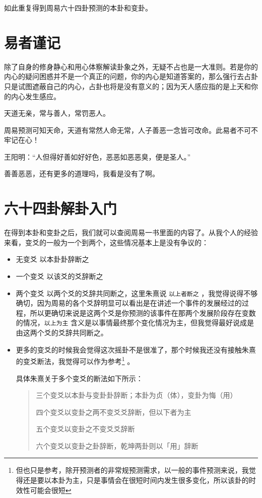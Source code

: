 \documentclass[12pt,oneside]{book}
\begin{document}
如此重复得到周易六十四卦预测的本卦和变卦。

\section{易者谨记}
除了自身的修身静心和用心体察解读卦象之外，无疑不占也是一大准则。若是你的内心的疑问困惑并不是一个真正的问题，你的内心是知道答案的，那么强行去占卦只是试图遮蔽自己的内心，占卦也将是没有意义的；因为天人感应指的是上天和你的内心发生感应。

天道无亲，常与善人，常罚恶人。

周易预测可知天命，天道有常然人命无常，人子善恶一念皆可改命。此易者不可不牢记在心！

王阳明：“人但得好善如好好色，恶恶如恶恶臭，便是圣人。”

善善恶恶，还有更多的道理吗，我看是没有了啊。

\section{六十四卦解卦入门}
在得到本卦和变卦之后，我们就可以查阅周易一书里面的内容了。从我个人的经验来看，变爻的一般为一个到两个，这些情况基本上是没有争议的：

\begin{itemize}
\item 无变爻 以本卦卦辞断之
\item 一个变爻 以该爻的爻辞断之
\item 两个变爻 以两个爻的爻辞共同断之，这里朱熹说 \verb+以上者断之+ ，我觉得说得不够确切，因为周易的各个爻辞明显可以看出是在讲述一个事件的发展经过的过程，所以更确切来说是这两个爻是你预测的该事件在那两个发展阶段存在变数的情况，\verb+以上为主+ 含义是以事情最终那个变化情况为主，但我觉得最好说成是由这两个爻的爻辞共同断之。
\item 更多的变爻的时候我会觉得这次摇卦不是很准了，那个时候我还没有接触朱熹的变爻断法，我觉得可以作为参考\footnote{但也只是参考，除开预测者的非常规预测需求，以一般的事件预测来说，我觉得还是要以本卦为主，只是事情会在很短时间内发生很多变化，所以该卦的时效性可能会很短} 。

具体朱熹关于多个变爻的断法如下所示：
\begin{quotation}
三个变爻以本卦与变卦卦辞断；本卦为贞（体），变卦为悔（用）

四个变爻以变卦之两不变爻爻辞断，但以下者为主

五个变爻以变卦之不变爻爻辞断

六个变爻以变卦之卦辞断，乾坤两卦则以「用」辞断
\end{quotation}

\end{itemize}
\end{document}
